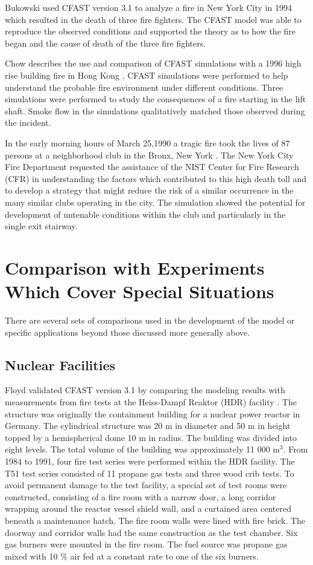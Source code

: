 Bukowski used CFAST version 3.1 to analyze a fire in New York City \cite{Bukowski:1996} in 1994 which resulted in the death of three fire fighters. The CFAST model was able to reproduce the observed conditions and supported the theory as to how the fire began and the cause of death of the three fire fighters.

Chow describes the use and comparison of CFAST simulations with a 1996 high rise building fire in Hong Kong \cite{Chow:1996}. CFAST simulations were performed to help understand the probable fire environment under different conditions. Three simulations were performed to study the consequences of a fire starting in the lift shaft. Smoke flow in the simulations qualitatively matched those observed during the incident.

In the early morning hours of March 25,1990 a tragic fire took the lives of 87 persons at a neighborhood club in the Bronx, New York \cite{Bukowski:1992}. The New York City Fire Department requested the assistance of the NIST Center for Fire Research (CFR) in understanding the factors which contributed to this high death toll and to develop a strategy that might reduce the risk of a similar occurrence in the many similar clubs operating in the city. The simulation showed the potential for development of untenable conditions within the club and particularly in the single exit stairway.

\section{Comparison with Experiments Which Cover Special Situations}

There are several sets of comparisons used in the development of the model or specific
applications beyond those discussed more generally above.

\subsection{Nuclear Facilities}

Floyd validated CFAST version 3.1 by comparing the modeling results with measurements from fire tests at
the Heiss-Dampf Reaktor (HDR) facility \cite{Floyd:2002}. The structure was originally the containment
building for a nuclear power reactor in Germany. The cylindrical structure was 20 m in diameter
and 50 m in height topped by a hemispherical dome 10 m in radius. The building was divided
into eight levels. The total volume of the building was approximately 11 000 m$^3$. From 1984 to
1991, four fire test series were performed within the HDR facility. The T51 test series consisted
of 11 propane gas tests and three wood crib tests. To avoid permanent damage to the test facility,
a special set of test rooms were constructed, consisting of a fire room with a narrow door, a long
corridor wrapping around the reactor vessel shield wall, and a curtained area centered beneath a
maintenance hatch. The fire room walls were lined with fire brick. The doorway and corridor
walls had the same construction as the test chamber. Six gas burners were mounted in the fire
room. The fuel source was propane gas mixed with 10 \% air fed at a constant rate to one of the
six burners.

